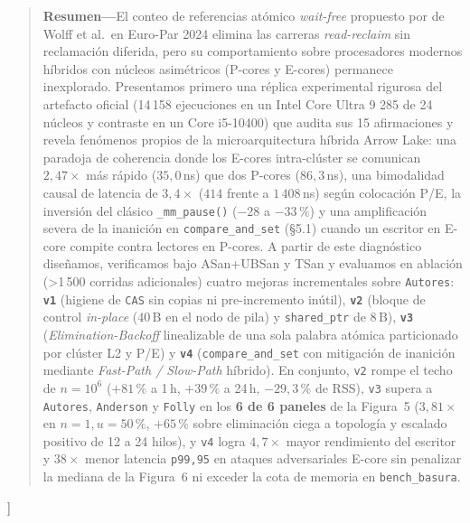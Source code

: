 \documentclass[10pt,twocolumn,a4paper]{article}
\begin{document}
{\begin{@twocolumnfalse}
\begin{quote}
\small
\textbf{Resumen---}El conteo de referencias atómico \emph{wait-free} propuesto por de Wolff et al.\ en Euro-Par 2024 elimina las carreras \emph{read-reclaim} sin reclamación diferida, pero su comportamiento sobre procesadores modernos híbridos con núcleos asimétricos (P-cores y E-cores) permanece inexplorado. Presentamos primero una réplica experimental rigurosa del artefacto oficial (14\,158 ejecuciones en un Intel Core Ultra 9 285 de 24 núcleos y contraste en un Core i5-10400) que audita sus 15 afirmaciones y revela fenómenos propios de la microarquitectura híbrida Arrow Lake: una paradoja de coherencia donde los E-cores intra-clúster se comunican $2{,}47\times$ más rápido ($35{,}0$\,ns) que dos P-cores ($86{,}3$\,ns), una bimodalidad causal de latencia de $3{,}4\times$ ($414$ frente a $1\,408$\,ns) según colocación P/E, la inversión del clásico \texttt{\_mm\_pause()} ($-28$ a $-33\,\%$) y una amplificación severa de la inanición en \texttt{compare\_and\_set} (\S 5.1) cuando un escritor en E-core compite contra lectores en P-cores. A partir de este diagnóstico diseñamos, verificamos bajo ASan+UBSan y TSan y evaluamos en ablación (>1\,500 corridas adicionales) cuatro mejoras incrementales sobre \texttt{Autores}: \textbf{\texttt{v1}} (higiene de \texttt{CAS} sin copias ni pre-incremento inútil), \textbf{\texttt{v2}} (bloque de control \emph{in-place} (40\,B en el nodo de pila) y \texttt{shared\_ptr} de 8\,B), \textbf{\texttt{v3}} (\emph{Elimination-Backoff} linealizable de una sola palabra atómica particionado por clúster L2 y P/E) y \textbf{\texttt{v4}} (\texttt{compare\_and\_set} con mitigación de inanición mediante \emph{Fast-Path / Slow-Path} híbrido). En conjunto, \texttt{v2} rompe el techo de $n=10^6$ ($+81\,\%$ a 1\,h, $+39\,\%$ a 24\,h, $-29{,}3\,\%$ de RSS), \texttt{v3} supera a \texttt{Autores}, \texttt{Anderson} y \texttt{Folly} en los \textbf{6 de 6 paneles} de la Figura~5 ($3{,}81\times$ en $n=1, u=50\,\%$, $+65\,\%$ sobre eliminación ciega a topología y escalado positivo de 12 a 24 hilos), y \texttt{v4} logra $4{,}7\times$ mayor rendimiento del escritor y $38\times$ menor latencia \texttt{p99,95} en ataques adversariales E-core sin penalizar la mediana de la Figura~6 ni exceder la cota de memoria en \texttt{bench\_basura}.
\end{quote}
\vspace{6pt}
\end{@twocolumnfalse}
}]

\end{document}
